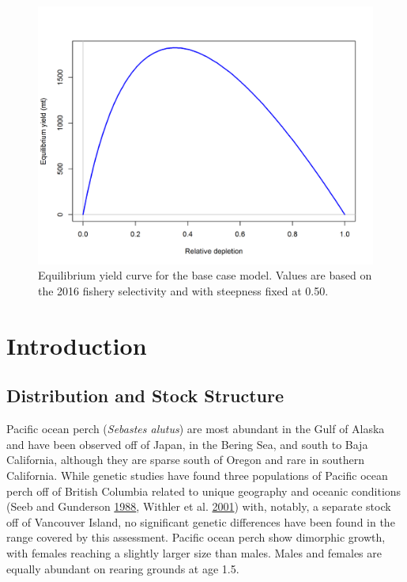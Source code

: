 \documentclass[12pt,]{article}
\begin{document}
\FloatBarrier

\begin{figure}
\centering
\includegraphics{r4ss/plots_mod1/yield1_yield_curve.png}
\caption{Equilibrium yield curve for the base case model. Values are
based on the 2016 fishery selectivity and with steepness fixed at 0.50.
\label{fig:Yield_all}}
\end{figure}

\FloatBarrier

\newpage

\renewcommand{\thefigure}{\arabic{figure}}
\renewcommand{\thetable}{\arabic{table}}

\setcounter{figure}{0} \setcounter{table}{0}


\section{Introduction}\label{introduction}

\subsection{Distribution and Stock
Structure}\label{distribution-and-stock-structure}

Pacific ocean perch (\emph{Sebastes alutus}) are most abundant in the
Gulf of Alaska and have been observed off of Japan, in the Bering Sea,
and south to Baja California, although they are sparse south of Oregon
and rare in southern California. While genetic studies have found three
populations of Pacific ocean perch off of British Columbia related to
unique geography and oceanic conditions (Seeb and Gunderson
\protect\hyperlink{ref-seeb_genetic_1988}{1988}, Withler et al.
\protect\hyperlink{ref-withler_co-existing_2001}{2001}) with, notably, a
separate stock off of Vancouver Island, no significant genetic
differences have been found in the range covered by this assessment.
Pacific ocean perch show dimorphic growth, with females reaching a
slightly larger size than males. Males and females are equally abundant
on rearing grounds at age 1.5.
\end{document}
